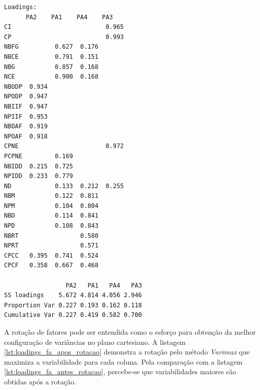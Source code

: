 \begin{lstlisting}[label={lst:loadings_fa_apos_rotacao}, caption={Carregamentos da AF após rotação}, captionpos=b]
Loadings:
      PA2    PA1    PA4    PA3   
CI                          0.965
CP                          0.993
NBFG          0.627  0.176       
NBCE          0.791  0.151       
NBG           0.857  0.168       
NCE           0.900  0.168       
NBODP  0.934                     
NPODP  0.947                     
NBIIF  0.947                     
NPIIF  0.953                     
NBOAF  0.919                     
NPOAF  0.918                     
CPNE                        0.972
PCPNE         0.169              
NBIDD  0.215  0.725              
NPIDD  0.233  0.779              
ND            0.133  0.212  0.255
NBM           0.122  0.811       
NPM           0.104  0.804       
NBD           0.114  0.841       
NPD           0.108  0.843       
NBRT                 0.580       
NPRT                 0.571       
CPCC   0.395  0.741  0.524       
CPCF   0.358  0.667  0.468       

                 PA2   PA1   PA4   PA3
SS loadings    5.672 4.814 4.056 2.946
Proportion Var 0.227 0.193 0.162 0.118
Cumulative Var 0.227 0.419 0.582 0.700

\end{lstlisting}

A rotação de fatores pode ser entendida como o esforço para obtenção da melhor configuração de variâncias no plano cartesiano. A listagem \ref{lst:loadings_fa_apos_rotacao} demonstra a rotação pelo método \textit{Varimax} que maximiza a variabilidade para cada coluna. Pela comparação com a listagem \ref{lst:loadings_fa_antes_rotacao}, percebe-se que variabilidades maiores são obtidas após a rotação.



\pagebreak